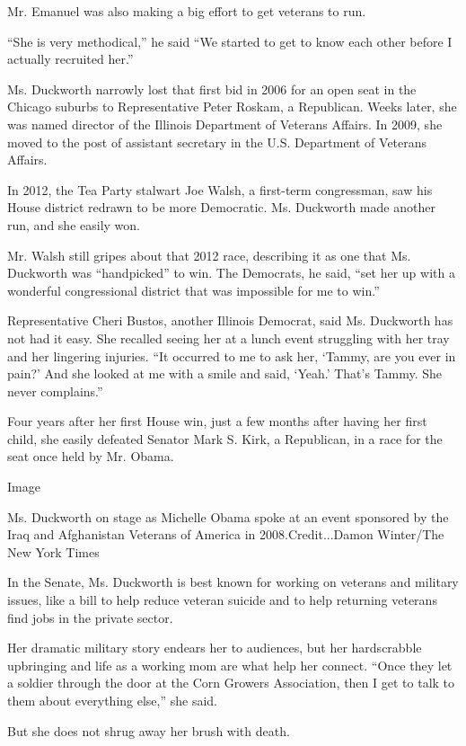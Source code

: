 Mr. Emanuel was also making a big effort to get veterans to run.

``She is very methodical,'' he said ``We started to get to know each
other before I actually recruited her.''

Ms. Duckworth narrowly lost that first bid in 2006 for an open seat in
the Chicago suburbs to Representative Peter Roskam, a Republican. Weeks
later, she was named director of the Illinois Department of Veterans
Affairs. In 2009, she moved to the post of assistant secretary in the
U.S. Department of Veterans Affairs.

In 2012, the Tea Party stalwart Joe Walsh, a first-term congressman, saw
his House district redrawn to be more Democratic. Ms. Duckworth made
another run, and she easily won.

Mr. Walsh still gripes about that 2012 race, describing it as one that
Ms. Duckworth was ``handpicked'' to win. The Democrats, he said, ``set
her up with a wonderful congressional district that was impossible for
me to win.''

Representative Cheri Bustos, another Illinois Democrat, said Ms.
Duckworth has not had it easy. She recalled seeing her at a lunch event
struggling with her tray and her lingering injuries. ``It occurred to me
to ask her, `Tammy, are you ever in pain?' And she looked at me with a
smile and said, `Yeah.' That's Tammy. She never complains.''

Four years after her first House win, just a few months after having her
first child, she easily defeated Senator Mark S. Kirk, a Republican, in
a race for the seat once held by Mr. Obama.

Image

Ms. Duckworth on stage as Michelle Obama spoke at an event sponsored by
the Iraq and Afghanistan Veterans of America in 2008.Credit...Damon
Winter/The New York Times

In the Senate, Ms. Duckworth is best known for working on veterans and
military issues, like a bill to help reduce veteran suicide and to help
returning veterans find jobs in the private sector.

Her dramatic military story endears her to audiences, but her
hardscrabble upbringing and life as a working mom are what help her
connect. ``Once they let a soldier through the door at the Corn Growers
Association, then I get to talk to them about everything else,'' she
said.

But she does not shrug away her brush with death.

